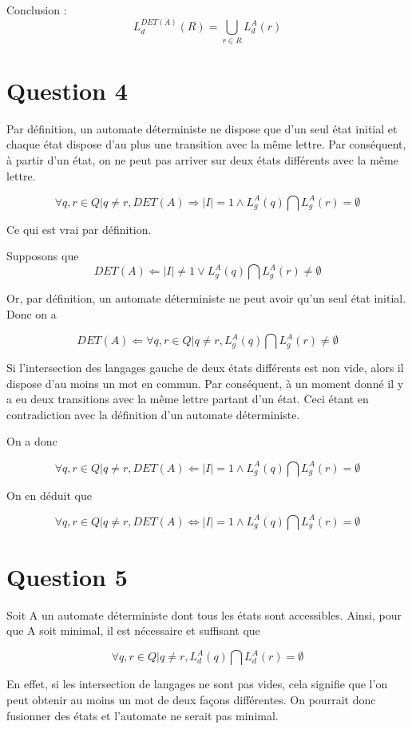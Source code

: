 \documentclass{article}
\begin{document}
Conclusion : 
\[ L_d^{DET(A)}(R) = \bigcup_{r \in R} L _d^A(r)\]

\section{Question 4}

Par définition, un automate déterministe ne dispose que d'un seul état initial et chaque état dispose d'au plus une transition avec la même lettre. 
Par conséquent, à partir d'un état, on ne peut pas arriver sur deux états différents avec la m\^eme lettre.

\[ \forall q, r \in Q | q \neq r,  DET(A) \Rightarrow |I| = 1 \wedge L_g^A(q) \bigcap  L_g^A(r) = \emptyset \]

Ce qui est vrai par définition.

Supposons que \[ DET(A) \Leftarrow |I| \neq 1 \vee L_g^A(q) \bigcap L_g^A(r) \neq \emptyset \]

Or, par définition, un automate déterministe ne peut avoir qu'un seul état initial.
Donc on a 

\[ DET(A)  \Leftarrow \forall q, r \in Q | q \neq r,  L_g^A(q) \bigcap L_g^A(r) \neq \emptyset \]

Si l'intersection des langages gauche de deux états différents est non vide, alors il dispose d'au moins un mot en commun. Par conséquent, à un moment donné il y a eu deux transitions avec la même lettre partant d'un état. Ceci étant en contradiction avec la définition d'un automate déterministe.

On a donc 

\[ \forall q, r \in Q | q \neq r,  DET(A) \Leftarrow |I| = 1 \wedge L_g^A(q) \bigcap  L_g^A(r) = \emptyset \]

On en déduit que

\[ \forall q, r \in Q | q \neq r,  DET(A) \iff |I| = 1 \wedge L_g^A(q) \bigcap  L_g^A(r) = \emptyset \]

\section{Question 5}

Soit A un automate déterministe dont tous les états sont accessibles. Ainsi, pour que A soit minimal, il est nécessaire et suffisant que 

\[ \forall q, r \in Q | q \neq r, L_d^A(q) \bigcap  L_d^A(r) = \emptyset \]

En effet, si les intersection de langages ne sont pas vides, cela signifie que l'on peut obtenir au moins un mot de deux façons différentes. On pourrait donc fusionner des états et l'automate ne serait pas minimal.
\end{document}

